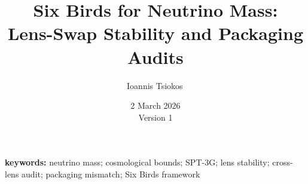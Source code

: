 \documentclass[11pt]{article}
\title{Six Birds for Neutrino Mass:\texorpdfstring{\\}{ } Lens-Swap Stability and Packaging Audits}
\author{Ioannis Tsiokos\,\orcidlink{0009-0009-7659-5964}}
\affiliation{}
\date{2 March 2026\\[4pt]{\small Version 1}}
\makeatletter
\numberwithin{equation}{section}
\newcommand{\printaffiliation}{\begin{center}\small \@affiliation\end{center}}
\makeatother
\begin{document}
\maketitle
\thispagestyle{firstpage}
\printaffiliation

\begin{abstract}

\end{abstract}

\noindent\textbf{keywords:} neutrino mass; cosmological bounds; SPT-3G; lens stability; cross-lens audit; packaging mismatch; Six Birds framework














\end{document}
